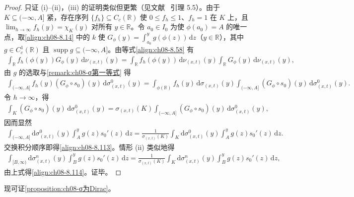\documentclass[../../main.tex]{subfiles}%
\begin{document}
\begin{proof}
只证 (i)--(ii)，(iii) 的证明类似但更繁（见文献~\cite{ref30} 引理 5.5）。由于 $K\subseteq(-\infty,A]$ 紧，存在序列 $\{f_h\}\subseteq C_c(\mathbb{R})$ 使 $0\leqslant f_h\leqslant1$、$f_h=1$ 在 $K$ 上，且 $\lim_{h\to\infty}f_h(y)=\chi_K(y)$ 对所有 $y\in\mathbb{R}$。令 $a_0\in I_0$ 为使 $\phi(a_0)=A$ 的唯一点，取\eqref{align:ch08-8.14} 中的 $k$ 使 $G_\phi(y)=\int_{a_0}^y g(\phi(z))\,\mathrm{d}z$（$y\in\mathbb{R}$），其中 $g\in C^1_c(\mathbb{R})$ 且 $\operatorname{supp}g\subseteq(-\infty,A]$。由等式\eqref{align:ch08-8.58} 有
\begin{align*}
\int_{\mathbb{R}}f_h(\phi(y))G_\phi(y)\,\mathrm{d}\nu_{(x,t)}(y)
=\int_{\mathbb{R}}f_h(\phi(y))\,\mathrm{d}\nu_{(x,t)}(y)\int_{\mathbb{R}}G_\phi(y)\,\mathrm{d}\nu_{(x,t)}(y),
\end{align*}
由 $g$ 的选取与\cref{remark:ch08-σ第一等式} 得
\begin{align*}
\int_{(-\infty,A]}f_h(y)(G_\phi\circ s_0)(y)\,\mathrm{d}\sigma^0_{(x,t)}(y)
=\int_{\phi(\mathbb{R})}f_h(y)\,\mathrm{d}\sigma_{(x,t)}(y)\int_{(-\infty,A]}(G_\phi\circ s_0)(y)\,\mathrm{d}\sigma^0_{(x,t)}(y).
\end{align*}
令 $h\to\infty$，得
\begin{align*}
\int_K(G_\phi\circ s_0)(y)\,\mathrm{d}\sigma^0_{(x,t)}(y)
=\sigma_{(x,t)}(K)\int_{(-\infty,A]}(G_\phi\circ s_0)(y)\,\mathrm{d}\sigma^0_{(x,t)}(y),
\end{align*}
因而显然
\begin{align*}
\int_{(-\infty,A]}\mathrm{d}\sigma^0_{(x,t)}(y)\int_A^y g(z)s_0'(z)\,\mathrm{d}z
=\frac{1}{\sigma_{(x,t)}(K)}\int_K\mathrm{d}\sigma^0_{(x,t)}(y)\int_A^y g(z)s_0'(z)\,\mathrm{d}z.
\end{align*}
交换积分顺序即得\eqref{align:ch08-8.113}。情形 (ii) 类似地得
\begin{align*}
\int_{[B,\infty)}\mathrm{d}\sigma^n_{(x,t)}(y)\int_B^y g(z)s_0'(z)\,\mathrm{d}z
=\frac{1}{\sigma_{(x,t)}(K)}\int_K\mathrm{d}\sigma^n_{(x,t)}(y)\int_B^y g(z)s_0'(z)\,\mathrm{d}z,
\end{align*}
由上式得\eqref{align:ch08-8.114}。证毕。
\end{proof}

现可证\cref{proposition:ch08-σ为Dirac}。
\end{document}
